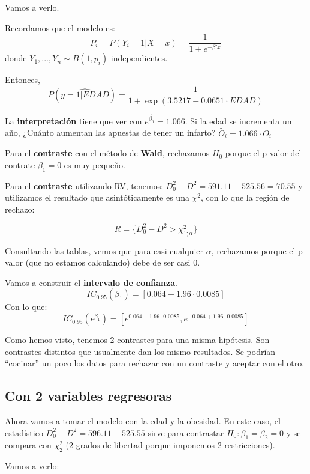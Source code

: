 \begin{example}
Vamos a verlo.

Recordamos que el modelo es:
\[P_i = P(Y_i =1 | X = x) = \frac{1}{1+e^{-β'x}}\] donde $Y_1,...,Y_n \sim B(1,p_i)$ independientes.

Entonces, \[P(\hat{y=1 | EDAD}) = \frac{1}{1+\exp(3.5217 - 0.0651 · EDAD)}\]

La \textbf{interpretación} tiene que ver con $e^{\hat{β_1}} = 1.066$. Si la edad se incrementa un año, ¿Cuánto aumentan las apuestas de tener un infarto? $\tilde{O_i} = 1.066·O_i$

Para el \textbf{contraste} con el método de \textbf{Wald}, rechazamos $H_0$ porque el p-valor del contrate $β_1 = 0$ es muy pequeño.

Para el \textbf{contraste} utilizando RV, tenemos: $D_0^2 - D^2 = 591.11 - 525.56 = 70.55$ y utilizamos el resultado que asintóticamente es una $\chi^2$, con lo que la región de rechazo:

\[R = \{D_0^2 - D^2 > \chi^2_{1;α}\}\]

Consultando las tablas, vemos que para casi cualquier $α$, rechazamos porque el p-valor (que no estamos calculando) debe de ser casi 0. 

Vamos a construir el \textbf{intervalo de confianza}.
\[IC_{0.95}(β_1) = [0.064 - 1.96 · 0.0085]\] 
Con lo que:
\[ IC_{0.95}(e^{β_1}) = [e^{0.064 - 1.96 · 0.0085},e^{-0.064 + 1.96 · 0.0085}] \] 

\end{example}


\obs Como hemos visto, tenemos 2 contrastes para una misma hipótesis. Son contrastes distintos que usualmente dan los mismo resultados. Se podrían ``cocinar'' un poco los datos para rechazar con un contraste y aceptar con el otro.


\subsection{Con 2 variables regresoras}

Ahora vamos a tomar el modelo con la edad y la obesidad. En este caso, el estadístico $D_0^2 - D^2 = 596.11 -525.55$ sirve para contrastar $H_0 : β_1 = β_2 = 0$ y se compara con $\chi^2_2$ (2 grados de libertad porque imponemos 2 restricciones).


Vamos a verlo:

